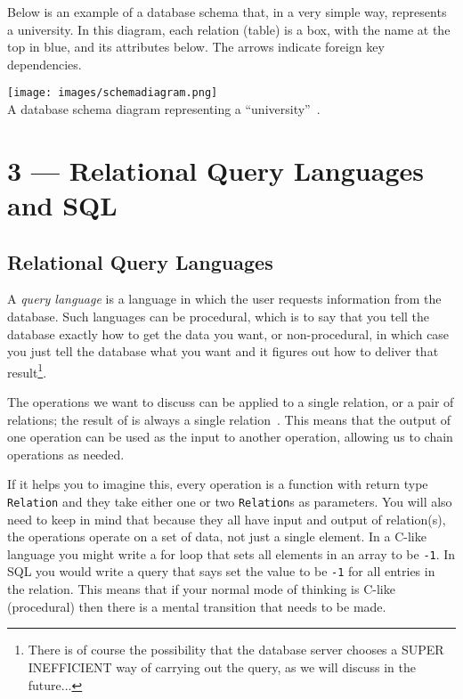 \documentclass[a4paper]{report}
\begin{document}
Below is an example of a database schema that, in a very simple way, represents a university. In this diagram, each relation (table) is a box, with the name at the top in blue, and its attributes below. The arrows indicate foreign key dependencies. 

\begin{center}
	\texttt{[image: images/schemadiagram.png]}\\
	A database schema diagram representing a ``university''~\cite{dsc}.
\end{center}









\chapter*{3 --- Relational Query Languages and SQL}


\section*{Relational Query Languages}

A \textit{query language} is a language in which the user requests information from the database. Such languages can be procedural, which is to say that you tell the database exactly how to get the data you want, or non-procedural, in which case you just tell the database what you want and it figures out how to deliver that result\footnote{There is of course the possibility that the database server chooses a SUPER INEFFICIENT way of carrying out the query, as we will discuss in the future...}.

The operations we want to discuss can be applied to a single relation, or a pair of relations; the result of is always a single relation~\cite{dsc}. This means that the output of one operation can be used as the input to another operation, allowing us to chain operations as needed. 

If it helps you to imagine this, every operation is a function with return type \texttt{Relation} and they take either one or two \texttt{Relation}s as parameters. You will also need to keep in mind that because they all have input and output of relation(s), the operations operate on a set of data, not just a single element. In a C-like language you might write a for loop that sets all elements in an array to be \texttt{-1}. In SQL you would write a query that says set the value to be \texttt{-1} for all entries in the relation. This means that if your normal mode of thinking is C-like (procedural) then there is a mental transition that needs to be made. 
\end{document}
